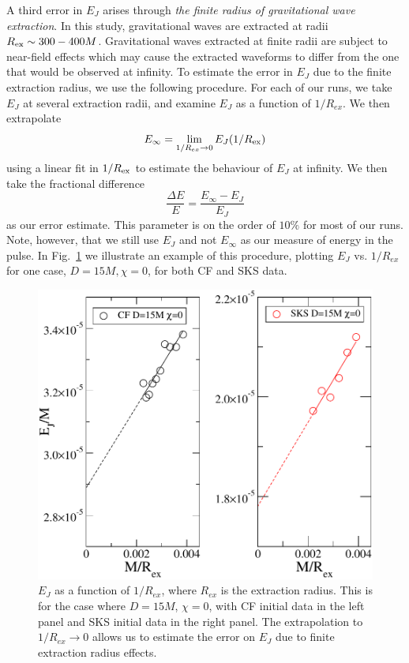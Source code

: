 A third error in $E_J$ arises through {\it the finite radius
    of gravitational wave extraction}.  In this study, gravitational waves are extracted at radii $R_{\rm ex}\sim 300-400M$.  Gravitational waves extracted at finite radii are subject to near-field effects which may cause the extracted
waveforms to differ from the one that would be observed at
infinity.  
To estimate the error in $E_J$ due to the finite extraction radius, we
use the following procedure. For each of our runs, we take $E_J$ at
several extraction radii, and examine $E_J$ as a function of
$1/R_{ex}$. We then extrapolate
\begin{equation}
E_{\infty} = \lim_{1/R_{ex}\rightarrow 0}E_J(1/R_{\rm ex})
\end{equation}
using a linear fit in $1/R_{\rm ex}$ to estimate the behaviour of $E_J$ at infinity. We
then take the fractional difference
\begin{equation}
\frac{\Delta E}{E} = \frac{E_{\infty}-E_J}{E_J}
\end{equation}
as our error estimate. This parameter is on the order of $10\%$ for
most of our runs. Note, however, that we still use $E_J$ and not $E_{\infty}$ as
our measure of energy in the pulse. In Fig.~\ref{fig:EvsRextr} we illustrate an
example of this procedure, plotting $E_J$ vs. $1/R_{ex}$ for one case,
$D=15M, \chi=0$, for both CF and SKS data.

\begin{figure}
  \includegraphics[scale=0.95]{chap5/EvsRextr}
  \caption[$E_J$ as a function of $1_R/{\rm ex}$.]{$E_J$ as a function of $1/R_{ex}$, where $R_{ex}$ is the
    extraction radius. This is for the case where $D=15M$, $\chi=0$,
    with CF initial data in the left panel and SKS initial data in the
    right panel. The extrapolation
    to $1/R_{ex}\rightarrow 0$ allows us to estimate the error on
    $E_J$ due to finite extraction radius effects. }

  \label{fig:EvsRextr}
\end{figure}

